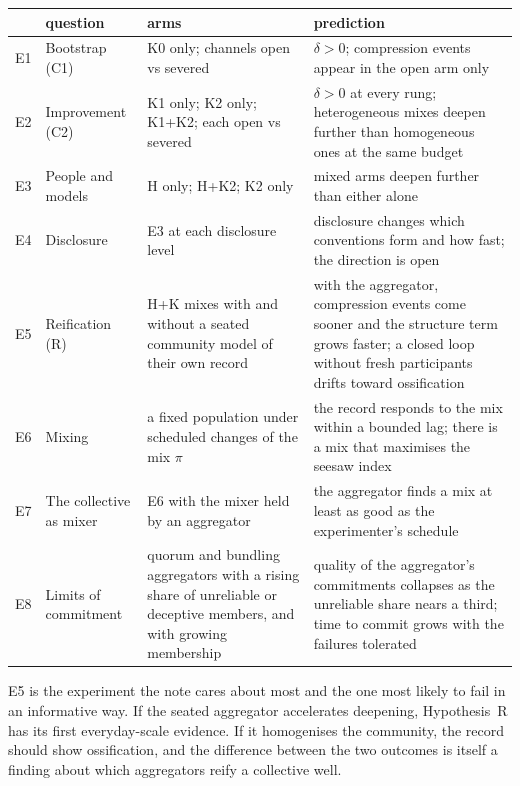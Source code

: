 \documentclass[11pt,a4paper]{article}
\begin{document}
\begin{center}\small
\begin{tabularx}{\linewidth}{@{}l>{\raggedright\arraybackslash}p{38mm}>{\raggedright\arraybackslash}p{36mm}X@{}}
\toprule
 & question & arms & prediction \\
\midrule
E1 & Bootstrap (C1) & K0 only; channels open vs severed & $\delta>0$; compression events
  appear in the open arm only \\
E2 & Improvement (C2) & K1 only; K2 only; K1+K2; each open vs severed & $\delta>0$ at every rung;
  heterogeneous mixes deepen further than homogeneous ones at the same budget \\
E3 & People and models & H only; H+K2; K2 only & mixed arms deepen further than either alone \\
E4 & Disclosure & E3 at each disclosure level & disclosure changes which conventions form and how
  fast; the direction is open \\
E5 & Reification (R) & H+K mixes with and without a seated community model of their own record &
  with the aggregator, compression events come sooner and the structure term grows faster; a
  closed loop without fresh participants drifts toward ossification \\
E6 & Mixing & a fixed population under scheduled changes of the mix $\pi$ & the record responds to
  the mix within a bounded lag; there is a mix that maximises the seesaw index \\
E7 & The collective as mixer & E6 with the mixer held by an aggregator & the aggregator finds a mix
  at least as good as the experimenter's schedule \\
E8 & Limits of commitment & quorum and bundling aggregators with a rising share of unreliable or
  deceptive members, and with growing membership & quality of the aggregator's commitments
  collapses as the unreliable share nears a third; time to commit grows with the failures tolerated \\
\bottomrule
\end{tabularx}
\end{center}

E5 is the experiment the note cares about most and the one most likely to fail in an informative
way. If the seated aggregator accelerates deepening, Hypothesis~R has its first everyday-scale
evidence. If it homogenises the community, the record should show ossification, and the
difference between the two outcomes is itself a finding about which aggregators reify a
collective well.
\end{document}

